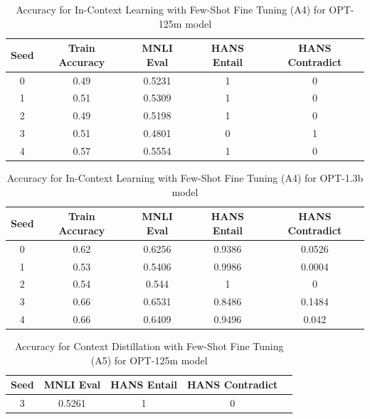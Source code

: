 \documentclass[10pt,twocolumn,letterpaper]{article}
\begin{document}
\begin{table}[h!]
\begin{center}
\begin{tabular}{|c|c|c|c|c|}
\hline
\textbf{Seed} & \textbf{Train Accuracy} & \textbf{MNLI Eval} & \textbf{HANS Entail} & \textbf{HANS Contradict} \\
\hline
\hline
0 & 0.49 & 0.5231 & 1 & 0 \\
1 & 0.51 & 0.5309 & 1 & 0 \\
2 & 0.49 & 0.5198 & 1 & 0 \\
3 & 0.51 & 0.4801 & 0 & 1 \\
4 & 0.57 & 0.5554 & 1 & 0 \\
\hline
\end{tabular}
\end{center}
\caption{Accuracy for In-Context Learning with Few-Shot Fine Tuning (A4) for OPT-125m model}
\end{table}

\begin{table}[h!]
\begin{center}
\begin{tabular}{|c|c|c|c|c|}
\hline
\textbf{Seed} & \textbf{Train Accuracy} & \textbf{MNLI Eval} & \textbf{HANS Entail} & \textbf{HANS Contradict} \\
\hline
\hline
0 & 0.62 & 0.6256 & 0.9386 & 0.0526 \\
1 & 0.53 & 0.5406 & 0.9986 & 0.0004 \\
2 & 0.54 & 0.544 & 1 & 0 \\
3 & 0.66 & 0.6531 & 0.8486 & 0.1484 \\
4 & 0.66 & 0.6409 & 0.9496 & 0.042 \\
\hline
\end{tabular}
\end{center}
\caption{Accuracy for In-Context Learning with Few-Shot Fine Tuning (A4) for OPT-1.3b model}
\end{table}

		
		
		
		
		
		

\begin{table}[h!]
	\begin{center}
	\begin{tabular}{|c|c|c|c|c|}
	\hline
	\textbf{Seed} & \textbf{MNLI Eval} & \textbf{HANS Entail} & \textbf{HANS Contradict} \\
	\hline
	\hline
	3 & 0.5261 & 1 & 0 \\
	\hline
	\end{tabular}
	\end{center}
	\caption{Accuracy for Context Distillation with Few-Shot Fine Tuning (A5) for OPT-125m model}
	\end{table}
	
\end{document}
